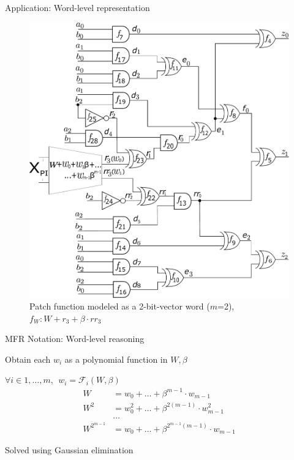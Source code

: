 \begin{frame}{\large Application: Word-level representation}
\begin{figure}[hbt]
\centering
    \includegraphics[scale = 0.24]{mas_3_ddc_mfr_b.pdf}
    \caption*{
    Patch function modeled as a 2-bit-vector word ($m$=2), 
    $f_W: W+ r_3 + \beta \cdot rr_3$}
\end{figure}
\end{frame}


\begin{frame}{\large MFR Notation: Word-level reasoning}
\bi
	\item Obtain each $w_i$ as a polynomial function in $W,\beta$
	\bi
		\item $\forall i \in 1,\dots,m,~~w_i= \mathcal{F}_i(W,\beta)$
	\ei
	\pause
	\begin{align*}
	W & = w_0 + \dots + \beta^{m-1} \cdot w_{m-1}\\
    W^2 & = w_0^2 + \dots + \beta^{2(m-1)}\cdot w_{m-1}^2\\
        & \dots \\
    W^{2^{m-1}} & = w_0 + \dots + \beta^{2^{m-1}(m-1)}\cdot w_{m-1}
    \end{align*}
	\pause
	\item Solved using Gaussian elimination
\ei
\end{frame}

